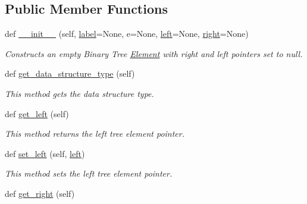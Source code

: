 \subsection*{Public Member Functions}
\begin{DoxyCompactItemize}
\item 
def \mbox{\hyperlink{class_bridges_1_1_bin_tree_element_1_1_bin_tree_element_a84d42e67dfa4b7fbae53ae797a10c13e}{\+\_\+\+\_\+init\+\_\+\+\_\+}} (self, \mbox{\hyperlink{class_bridges_1_1_element_1_1_element_a301fe5be8cf72b2c62f6a218feeb9166}{label}}=None, e=None, \mbox{\hyperlink{class_bridges_1_1_bin_tree_element_1_1_bin_tree_element_ae2011efda691620e8c76e366131b0195}{left}}=None, \mbox{\hyperlink{class_bridges_1_1_bin_tree_element_1_1_bin_tree_element_a5130987f56eff4edcc8c8ef323f8cd3d}{right}}=None)
\begin{DoxyCompactList}\small\item\em Constructs an empty Binary Tree \mbox{\hyperlink{namespace_bridges_1_1_element}{Element}} with right and left pointers set to null. \end{DoxyCompactList}\item 
def \mbox{\hyperlink{class_bridges_1_1_bin_tree_element_1_1_bin_tree_element_a141edccea36285810ded005aedd1ae41}{get\+\_\+data\+\_\+structure\+\_\+type}} (self)
\begin{DoxyCompactList}\small\item\em This method gets the data structure type. \end{DoxyCompactList}\item 
def \mbox{\hyperlink{class_bridges_1_1_bin_tree_element_1_1_bin_tree_element_afb02902f3dcf40e561f3d477c088cfbd}{get\+\_\+left}} (self)
\begin{DoxyCompactList}\small\item\em This method returns the left tree element pointer. \end{DoxyCompactList}\item 
def \mbox{\hyperlink{class_bridges_1_1_bin_tree_element_1_1_bin_tree_element_aa3d0afa18e6b058b4b1d8625ca6eca9a}{set\+\_\+left}} (self, \mbox{\hyperlink{class_bridges_1_1_bin_tree_element_1_1_bin_tree_element_ae2011efda691620e8c76e366131b0195}{left}})
\begin{DoxyCompactList}\small\item\em This method sets the left tree element pointer. \end{DoxyCompactList}\item 
def \mbox{\hyperlink{class_bridges_1_1_bin_tree_element_1_1_bin_tree_element_a3c013517d9600682363a4a8ee88dfc80}{get\+\_\+right}} (self)

\end{DoxyCompactItemize}
